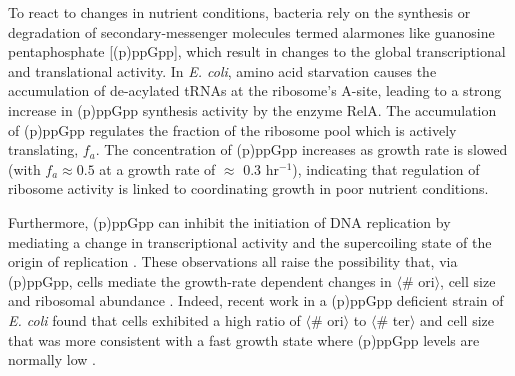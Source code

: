 
To react to changes in nutrient conditions, bacteria rely on
the synthesis or degradation of secondary-messenger molecules termed alarmones
like guanosine pentaphosphate [(p)ppGpp], which result in changes to the global
transcriptional and translational activity. In \textit{E. coli}, amino acid
starvation causes the accumulation of de-acylated tRNAs at the ribosome's
A-site, leading to a strong increase in (p)ppGpp synthesis activity by the
enzyme RelA\citep{hauryliuk2015}. The accumulation of (p)ppGpp regulates the
fraction of the ribosome pool which is actively translating, $f_a$. The
concentration of (p)ppGpp increases as growth rate is slowed (with $f_a \approx
0.5$ at a growth rate of $\approx$ 0.3 hr$^{-1}$), indicating that regulation of
ribosome activity is linked to coordinating growth in poor nutrient conditions.

Furthermore, (p)ppGpp can inhibit the initiation of DNA
replication by mediating a change in transcriptional activity and the
supercoiling state of the origin of replication \citep{kraemer2019}. These
observations all raise the possibility that, via (p)ppGpp, cells mediate the
growth-rate dependent changes in $\langle$\# ori$\rangle$, cell size and
ribosomal abundance \citep{zhu2019, Buke2020}. Indeed, recent work in a
(p)ppGpp deficient strain of \textit{E. coli} found that cells exhibited a
high ratio of $\langle$\# ori$\rangle$ to $\langle$\# ter$\rangle$ and cell
size that was more consistent with a fast growth state where (p)ppGpp levels
are normally low \citep{fernandezcoll2020}.

